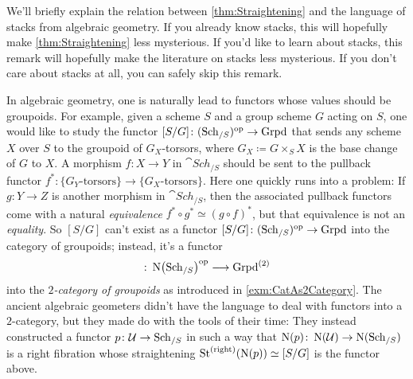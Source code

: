 \begin{numpar}\label{par:Stacks}
	We'll briefly explain the relation between \cref{thm:Straightening} and the language of stacks from algebraic geometry. If you already know stacks, this will hopefully make \cref{thm:Straightening} less mysterious. If you'd like to learn about stacks, this remark will hopefully make the literature on stacks less mysterious. If you don't care about stacks at all, you can safely skip this remark.
	
	In algebraic geometry, one is naturally lead to functors whose values should be groupoids. For example, given a scheme $S$ and a group scheme $G$ acting on $S$, one would like to study the functor $[S/G]\colon (\mathrm{Sch}_{/S})^{\mathrm{op}}\rightarrow \mathrm{Grpd}$ that sends any scheme $X$ over $S$ to the groupoid of $G_X$-torsors, where $G_X\coloneqq G\times_SX$ is the base change of $G$ to $X$. A morphism $f\colon X\rightarrow Y$ in $\cat{Sch}_{/S}$ should be sent to the pullback functor $f^*\colon \{G_Y\text{-torsors}\}\rightarrow \{G_X\text{-torsors}\}$. Here one quickly runs into a problem: If $g\colon Y\rightarrow Z$ is another morphism in $\cat{Sch}_{/S}$, then the associated pullback functors come with a natural \emph{equivalence} $f^*\circ g^*\simeq (g\circ f)^*$, but that equivalence is not an \emph{equality}. So $[S/G]$ can't exist as a functor $[S/G]\colon (\mathrm{Sch}_{/S})^{\mathrm{op}}\rightarrow \mathrm{Grpd}$ into the category of groupoids; instead, it's a functor
	\begin{equation*}
		[S/G]\colon \N\left(\cat{Sch}_{/S}\right)^\op\longrightarrow \cat{Grpd}^{(2)}
	\end{equation*}
	into the \emph{$2$-category of groupoids} as introduced in \cref{exm:CatAs2Category}. The ancient algebraic geometers didn't have the language to deal with functors into a $2$-category, but they made do with the tools of their time: They instead constructed a functor $p\colon \mathcal{U}\rightarrow \mathrm{Sch}_{/S}$ in such a way that $\operatorname{N}(p)\colon \operatorname{N}(\mathcal{U})\rightarrow \operatorname{N}(\mathrm{Sch}_{/S})$ is a right fibration whose straightening $\operatorname{St}^{(\mathrm{right})}(\operatorname{N}(p))\simeq [S/G]$ is the functor above.%

\end{numpar}
